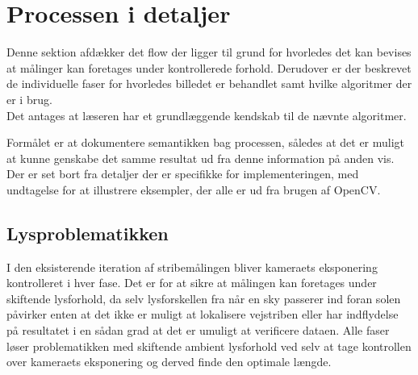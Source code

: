 \section{Processen i detaljer\label{ref::process}}

Denne sektion afdækker det flow der ligger til grund for hvorledes det kan bevises at målinger kan foretages under kontrollerede forhold. Derudover er der beskrevet de individuelle faser for hvorledes billedet er behandlet samt hvilke algoritmer der er i brug.\\Det antages at læseren har et grundlæggende kendskab til de nævnte algoritmer.

Formålet er at dokumentere semantikken bag processen, således at det er muligt at kunne genskabe det samme resultat ud fra denne information på anden vis.\\
Der er set bort fra detaljer der er specifikke for implementeringen, med undtagelse for at illustrere eksempler, der alle er ud fra brugen af OpenCV.

\subsection{Lysproblematikken}
I den eksisterende iteration af stribemålingen bliver kameraets eksponering kontrolleret i hver fase. Det er for at sikre at målingen kan foretages under skiftende lysforhold, da selv lysforskellen fra når en sky passerer ind foran solen påvirker enten at det ikke er muligt at lokalisere vejstriben eller har indflydelse på resultatet i en sådan grad at det er umuligt at verificere dataen.
Alle faser løser problematikken med skiftende ambient lysforhold ved selv at tage kontrollen over kameraets eksponering og derved finde den optimale længde.\\

